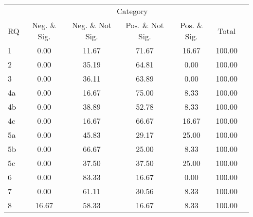 \begin{tabular}{lcccccc}
\hline
\hline
 & \multicolumn{5}{c}{Category} \\
RQ&Neg. \& Sig.&Neg. \& Not Sig.&Pos. \& Not Sig.&Pos. \& Sig.&Total \\
%
\hline
1&0.00&11.67&71.67&16.67&100.00 \\
2&0.00&35.19&64.81&0.00&100.00 \\
3&0.00&36.11&63.89&0.00&100.00 \\
4a&0.00&16.67&75.00&8.33&100.00 \\
4b&0.00&38.89&52.78&8.33&100.00 \\
4c&0.00&16.67&66.67&16.67&100.00 \\
5a&0.00&45.83&29.17&25.00&100.00 \\
5b&0.00&66.67&25.00&8.33&100.00 \\
5c&0.00&37.50&37.50&25.00&100.00 \\
6&0.00&83.33&16.67&0.00&100.00 \\
7&0.00&61.11&30.56&8.33&100.00 \\
8&16.67&58.33&16.67&8.33&100.00 \\
\hline
\hline
\end{tabular}
